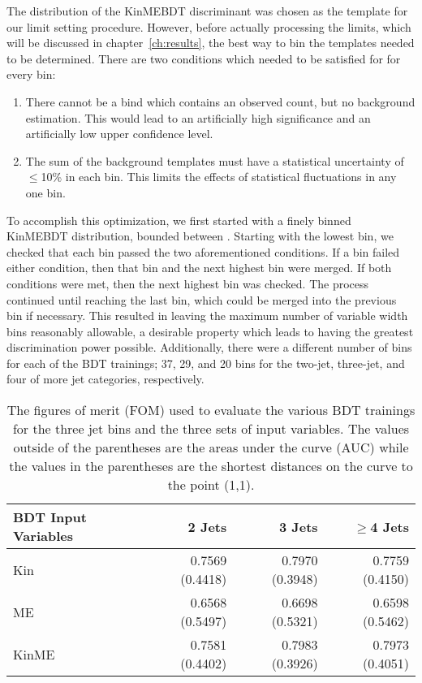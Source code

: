 The distribution of the KinMEBDT discriminant was chosen as the template for our limit setting procedure.
However, before actually processing the limits, which will be discussed in chapter~\ref{ch:results}, the best way to bin the templates needed to be determined.
There are two conditions which needed to be satisfied for for every bin:
\begin{enumerate}
  \item There cannot be a bind which contains an observed count, but no background estimation. This would lead to an artificially high significance and an artificially low upper confidence level.
  \item The sum of the background templates must have a statistical uncertainty of $\leqslant$10\% in each bin. This limits the effects of statistical fluctuations in any one bin.
\end{enumerate}
To accomplish this optimization, we first started with a finely binned KinMEBDT distribution, bounded between .
Starting with the lowest bin, we checked that each bin passed the two aforementioned conditions.
If a bin failed either condition, then that bin and the next highest bin were merged.
If both conditions were met, then the next highest bin was checked.
The process continued until reaching the last bin, which could be merged into the previous bin if necessary.
This resulted in leaving the maximum number of variable width bins reasonably allowable, a desirable property which leads to having the greatest discrimination power possible.
Additionally, there were a different number of bins for each of the BDT trainings; 37, 29, and 20 bins for the two-jet, three-jet, and four of more jet categories, respectively.

\begin{table}[htbp]
\centering
\begin{tabular}{lrrr} \hline
BDT Input Variables & 2 Jets          & 3 Jets          & $\geqslant$4 Jets \\\hline
Kin                 & 0.7569 (0.4418) & 0.7970 (0.3948) & 0.7759 (0.4150)   \\
ME                  & 0.6568 (0.5497) & 0.6698 (0.5321) & 0.6598 (0.5462)   \\
KinME               & 0.7581 (0.4402) & 0.7983 (0.3926) & 0.7973 (0.4051)   \\\hline
\end{tabular}
\caption{The  figures of merit (FOM) used to evaluate the various BDT trainings for the three jet bins and the three sets of input variables. The values outside of the parentheses are the areas under the curve (AUC) while the values in the parentheses are the shortest distances on the curve to the point (1,1).}
\label{tab:BDT_FOM_comparison}
\end{table}

